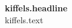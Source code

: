 \documentclass{article}
\begin{document}
\textbf{
  {{kiffels.headline}}
}\\

{{kiffels.text}}
\end{document}
